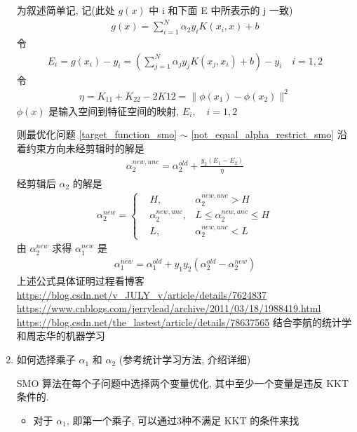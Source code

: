 \documentclass[oneside, 12pt]{ctexbook}
\begin{document}
\begin{enumerate}
					为叙述简单记, 记(此处 $g(x)$ 中 i 和下面 E 中所表示的 j 一致)
						\begin{align}
							g(x) = \sum_{i=1}^{N} \alpha_2 y_i K(x_i, x) + b
						\end{align}
						令
						\begin{align}
							E_i = g(x_i) - y_i = \left( \sum_{j=1}^{N} \alpha_j y_j K(x_j, x_i) + b \right) - y_i \quad i=1,2
						\end{align}
						令
						\begin{align}
							\eta = K_{11} + K_{22} - 2K{12} = \parallel \phi(x_1) - \phi(x_2) \parallel^2
						\end{align}
						$\phi(x)$ 是输入空间到特征空间的映射, $E_i, \quad i=1,2$
						
						则最优化问题 \ref{target_function_smo} $\sim$ \ref{not_equal_alpha_restrict_smo} 沿着约束方向未经剪辑时的解是
						\begin{align}
							\alpha_2^{new, unc} = \alpha_2^{old} + \frac{y_2(E_1 - E_2)}{\eta}
						\end{align}
						经剪辑后 $\alpha_2$ 的解是
						\begin{align}
							\alpha_2^{new} = \left\{
								\begin{matrix}
									&H, &\alpha_2^{new, unc} > H\\
									&\alpha_2^{new, unc}, &L\leq \alpha_2^{new, unc} \leq H\\
									&L, &\alpha_2^{new, unc} < L
								\end{matrix}
							\right.
						\end{align}
						由 $\alpha_2^{new}$ 求得 $\alpha_1^{new}$ 是
							\begin{align}
								\alpha_1^{new} = \alpha_1^{old} + y_1 y_2 (\alpha_2^{old} - \alpha_2^{new})
							\end{align}
						上述公式具体证明过程看博客
						\url{https://blog.csdn.net/v_JULY_v/article/details/7624837}
						\url{https://www.cnblogs.com/jerrylead/archive/2011/03/18/1988419.html}
						\url{https://blog.csdn.net/the_lastest/article/details/78637565}
						结合李航的统计学和周志华的机器学习
					
					\item 如何选择乘子 $\alpha_1$ 和 $\alpha_2$ (参考统计学习方法, 介绍详细)
					
					SMO 算法在每个子问题中选择两个变量优化, 其中至少一个变量是违反 KKT 条件的.
						\begin{itemize}
							\item 对于 $\alpha_1$, 即第一个乘子, 可以通过3种不满足 KKT 的条件来找
							

\end{itemize}
\end{enumerate}
\end{document}

